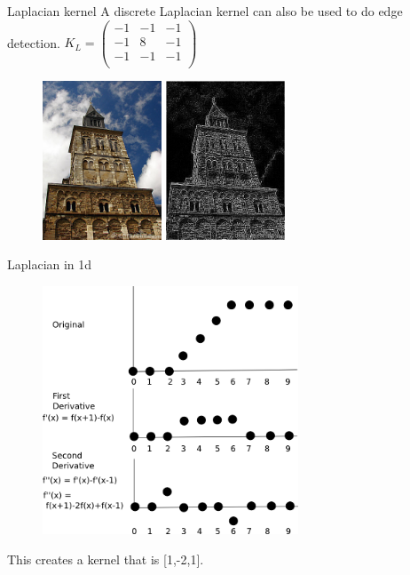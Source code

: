 \documentclass{beamer}
\begin{document}
\begin{frame}{Laplacian kernel}
A discrete Laplacian kernel can also be used to do edge detection. 
$K_L = \begin{pmatrix}
	-1 & -1 & -1\\
	-1 & 8 & -1\\
	-1 & -1 & -1\\
\end{pmatrix}$
\begin{figure}[ht]
\includegraphics[width=1.4in]{churchin.jpg}
\hspace{.1in}
\includegraphics[width=1.4in]{churchoutlaplace.jpg}
\hspace{.1in}
\end{figure}

\end{frame}


\begin{frame}{Laplacian in 1d}
\begin{figure}[ht]
\includegraphics[width=3in]{discreteLaplacian.png}
\end{figure}
This creates a kernel that is [1,-2,1].
\end{frame}
\end{document}
